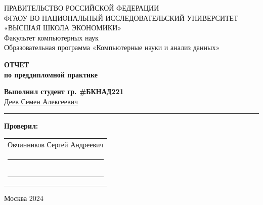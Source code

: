 \begin{titlepage}
\newpage

{
\begin{center}
ПРАВИТЕЛЬСТВО РОССИЙСКОЙ ФЕДЕРАЦИИ\\
ФГАОУ ВО НАЦИОНАЛЬНЫЙ ИССЛЕДОВАТЕЛЬСКИЙ УНИВЕРСИТЕТ\\
«ВЫСШАЯ ШКОЛА ЭКОНОМИКИ»
\\
\bigskip
Факультет компьютерных наук\\
Образовательная программа «Компьютерные науки и анализ данных»
\end{center}
}

\vspace{7em}

\begin{center}
{\bf ОТЧЕТ}\\
{\bf по преддипломной практике}\\
\end{center}

\vspace{2em}

\begin{flushright}
\textbf{Выполнил студент гр. \#БКНАД221}\\
\underline{Деев Семен Алексеевич}\\
\rule{4.5cm}{0.15mm}
\end{flushright}

\vspace{1em}
{\bf Проверил: \vspace{2mm}}

{
\begin{tabular}{l}
Овчинников Сергей Андреевич\\
\rule{6cm}{0.15mm} \\
\rule{6cm}{0.15mm}
\end{tabular}}




\vspace{\fill}

\begin{center}
Москва 2024
\end{center}

\end{titlepage}

